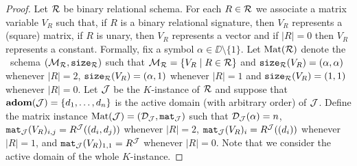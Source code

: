 \begin{proof}	
Let $\mathcal{R}$ be binary relational schema. For each $R\in \mathcal{R}$ we associate a matrix variable 
$V_R$ such that, if $R$ is a binary relational signature, then $V_R$ represents a (square) matrix, 
if $R$ is unary, then $V_R$ represents a vector and if $|R|=0$ then $V_R$ represents a constant. Formally, 
fix a symbol $\alpha \in \DD \setminus \{1\}$. Let $\text{Mat}(\mathcal{R})$ denote the \lang \ schema
$(\mathcal{M}_{\mathcal{R}},\texttt{size}_{\mathcal{R}})$ such that $\mathcal{M}_{\mathcal{R}} = \{ V_R \mid R \in \mathcal{R}\}$ and $\texttt{size}_{\mathcal{R}}(V_R) = (\alpha, \alpha)$ 
whenever $|R| = 2$, $\texttt{size}_{\mathcal{R}}(V_R) = (\alpha, 1)$ whenever $|R|=1$ and $\texttt{size}_{\mathcal{R}}(V_R) = (1, 1)$ whenever $|R|=0$. 
Let $\mathcal{J}$ be the $K$-instance of $\mathcal{R}$ and suppose that $\mathbf{adom}(\mathcal{J}) = \{d_1, \ldots, d_n\}$ is 
the active domain (with arbitrary order) of $\mathcal{J}$. 
Define the matrix instance $\text{Mat}(\mathcal{J}) = (\mathcal{D}_{\mathcal{J}},\texttt{mat}_{\mathcal{J}})$ such 
that $\mathcal{D}_{\mathcal{J}}(\alpha) = n$, $\texttt{mat}_{\mathcal{J}}(V_R)_{i,j} = R^{\mathcal{J}}((d_i, d_j))$ whenever $|R|=2$, $\texttt{mat}_{\mathcal{J}}(V_R)_{i} = R^{\mathcal{J}}((d_i))$ 
whenever $|R|=1$, 
and $\texttt{mat}_{\mathcal{J}}(V_R)_{1,1} = R^{\mathcal{J}}$ whenever $|R|=0$. 
Note that we consider the active domain of the whole $K$-instance.

\newcommand{\earae}{e_{\arae}}


\end{proof}
